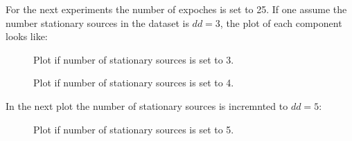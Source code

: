 \documentclass[a4paper, 12pt, titlepage]{article}
\begin{document}
For the next experiments the number of expoches is set to 25. If one assume the number stationary sources in the dataset is $dd=3$, the plot of each component looks like:
\begin{figure}[H]
	\centering
	\caption{ Plot if number of stationary sources is set to 3.}
\end{figure}

\begin{figure}[H]
	\centering
	\caption{ Plot if number of stationary sources is set to 4.}
\end{figure}


In the next plot the number of stationary sources is incremnted to $dd=5$:

\begin{figure}[H]
	\centering
	\caption{ Plot if number of stationary sources is set to 5.}
\end{figure}
\end{document}
